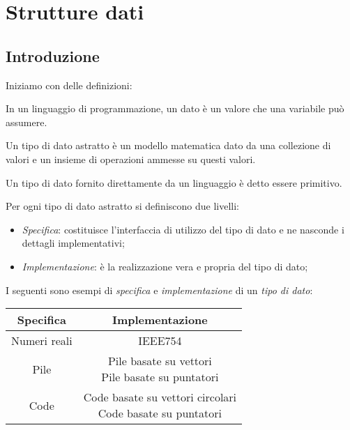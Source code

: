 \chapter{Strutture dati}
\section{Introduzione}
Iniziamo con delle definizioni:
\begin{definition}[Dato]
    In un linguaggio di programmazione, un dato è un valore che una variabile
    può assumere.
\end{definition}
\begin{definition}
    Un tipo di dato astratto è un modello matematica dato da una collezione di
    valori e un insieme di operazioni ammesse su questi valori.
\end{definition}
\begin{definition}
    Un tipo di dato fornito direttamente da un linguaggio è detto essere
    primitivo.
\end{definition}
\begin{definition}
    Per ogni tipo di dato astratto si definiscono due livelli:
    \begin{itemize}
        \item \emph{Specifica}: costituisce l'interfaccia di utilizzo del tipo
        di dato e ne nasconde i dettagli implementativi;
        \item \emph{Implementazione}: è la realizzazione vera e propria del tipo
        di dato;
    \end{itemize}
\end{definition}\noindent
I seguenti sono esempi di \emph{specifica} e \emph{implementazione} di un
\emph{tipo di dato}:
\begin{table}[h]
    \centering
    \renewcommand{\arraystretch}{1.2}
    \begin{tabular}{|c|c|}
        \hline
        \textbf{Specifica} & \textbf{Implementazione}\\
        \hline
        Numeri reali & IEEE754\\
        \hline
        Pile & \parbox[t]{6cm}{Pile basate su vettori\\
        Pile basate su puntatori}\\
        \hline
        Code & \parbox[t]{6cm}{Code basate su vettori circolari\\
        Code basate su puntatori}\\
        \hline
    \end{tabular}
\end{table}

